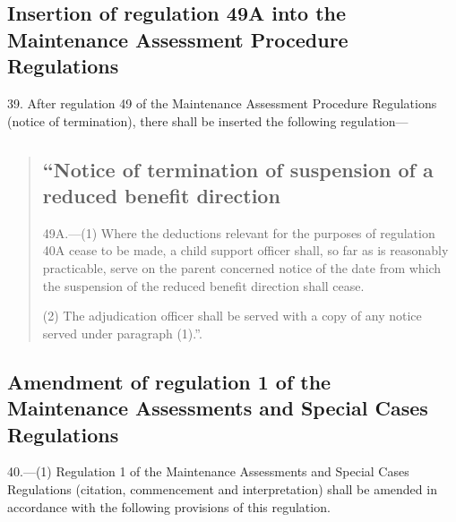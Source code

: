 \documentclass[12pt,a4paper]{article}
\begin{document}
\subsection[39. Insertion of regulation 49A into the Maintenance Assessment Procedure Regulations]{Insertion of regulation 49A into the Maintenance Assessment Procedure Regulations}

39.  After regulation 49 of the Maintenance Assessment Procedure Regulations (notice of termination), there shall be inserted the following regulation—
\begin{quotation}
\subsection*{“Notice of termination of suspension of a reduced benefit direction}

49A.—(1) Where the deductions relevant for the purposes of regulation 40A cease to be made, a child support officer shall, so far as is reasonably practicable, serve on the parent concerned notice of the date from which the suspension of the reduced benefit direction shall cease.

(2) The adjudication officer shall be served with a copy of any notice served under paragraph (1).”.
\end{quotation}

\subsection[40. Amendment of regulation 1 of the Maintenance Assessments and Special Cases Regulations]{Amendment of regulation 1 of the Maintenance Assessments and Special Cases Regulations}

40.—(1) Regulation 1 of the Maintenance Assessments and Special Cases Regulations (citation, commencement and interpretation) shall be amended in accordance with the following provisions of this regulation.
\end{document}
